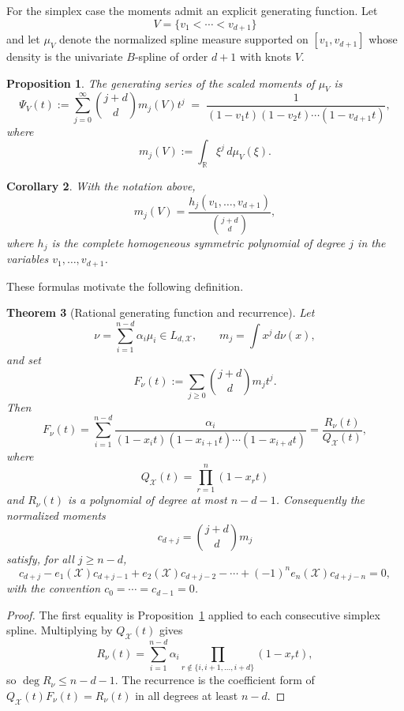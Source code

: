 \documentclass[reqno]{amsart}
\newtheorem{theorem}{Theorem}
\numberwithin{theorem}{section}
\newtheorem{proposition}[theorem]{Proposition}
\newtheorem{corollary}[theorem]{Corollary}
\newcommand{\RR}{\mathbb{R}}
\newcommand{\cX}{\mathcal{X}}
\begin{document}
For the simplex case the moments admit an explicit generating function. Let
\[
V=\{v_1<\cdots<v_{d+1}\}
\]
and let $\mu_V$ denote the normalized spline measure supported on $[v_1,v_{d+1}]$ whose density is the univariate $B$-spline of order $d+1$ with knots $V$.

\begin{proposition}\label{prop:moments}
The generating series of the scaled moments of $\mu_V$ is
\[
\Psi_V(t):=\sum_{j=0}^\infty \binom{j+d}{d} m_j(V)t^j
\;=
\;\frac{1}{(1-v_1t)(1-v_2t)\cdots(1-v_{d+1}t)},
\]
where
\[
m_j(V):=\int_{\RR} \xi^j\,d\mu_V(\xi).
\]
\end{proposition}

\begin{corollary}\label{cor:mom}
With the notation above,
\[
m_j(V)=\frac{h_j(v_1,\dots,v_{d+1})}{\binom{j+d}{d}},
\]
where $h_j$ is the complete homogeneous symmetric polynomial of degree $j$ in the variables $v_1,\dots,v_{d+1}$.
\end{corollary}

These formulas motivate the following definition.

\begin{theorem}[Rational generating function and recurrence]\label{th:rational-recurrence}
Let
\[
\nu=\sum_{i=1}^{n-d}\alpha_i\mu_i\in L_{d,\cX},
\qquad
m_j=\int x^j\,d\nu(x),
\]
and set
\[
F_\nu(t):=\sum_{j\ge 0}\binom{j+d}{d}m_jt^j .
\]
Then
\begin{equation}\label{eq:rationalF}
F_\nu(t)=
\sum_{i=1}^{n-d}
\frac{\alpha_i}{(1-x_it)(1-x_{i+1}t)\cdots(1-x_{i+d}t)}
=\frac{R_\nu(t)}{Q_\cX(t)},
\end{equation}
where
\[
Q_\cX(t)=\prod_{r=1}^{n}(1-x_rt)
\]
and $R_\nu(t)$ is a polynomial of degree at most $n-d-1$. Consequently the normalized moments
\[
c_{d+j}=\binom{j+d}{d}m_j
\]
satisfy, for all $j\ge n-d$,
\begin{equation}\label{eq:recurrence}
c_{d+j}-e_1(\cX)c_{d+j-1}+e_2(\cX)c_{d+j-2}-\cdots+(-1)^ne_n(\cX)c_{d+j-n}=0,
\end{equation}
with the convention $c_0=\cdots=c_{d-1}=0$.
\end{theorem}

\begin{proof}
The first equality is Proposition~\ref{prop:moments} applied to each consecutive simplex spline. Multiplying by $Q_\cX(t)$ gives
\[
R_\nu(t)=\sum_{i=1}^{n-d}\alpha_i
\prod_{r\notin\{i,i+1,\dots,i+d\}}(1-x_rt),
\]
so $\deg R_\nu\le n-d-1$. The recurrence is the coefficient form of
$Q_\cX(t)F_\nu(t)=R_\nu(t)$ in all degrees at least $n-d$.
\end{proof}
\end{document}
